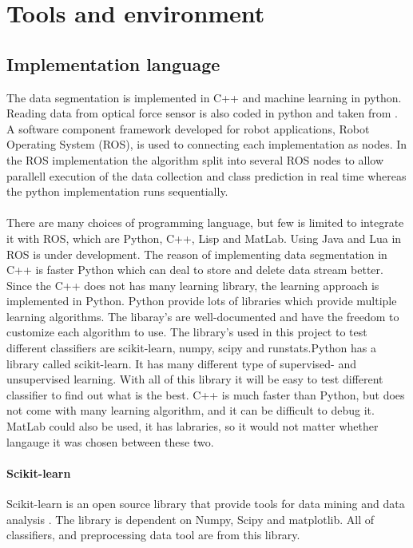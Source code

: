 \documentclass[USenglish]{ifimaster}  %
\begin{document}
\section{Tools and environment}

\subsection{Implementation language}
The data segmentation is implemented in C++ and machine learning in python. Reading data from optical force sensor is also coded in python and taken from \cite{optoRos}. A software component framework developed for robot applications, Robot Operating System (ROS), is used to connecting each implementation as nodes. In the ROS implementation the algorithm split into several ROS nodes to allow parallell execution of the data collection and class prediction in real time whereas the python implementation runs sequentially.
\\
\\
There are many choices of programming language, but few is limited to integrate it with ROS, which are Python, C++, Lisp and MatLab. Using Java and Lua in ROS is under development. The reason of implementing data segmentation in C++ is faster Python which can deal to store and delete data stream better. Since the C++ does not has many learning library, the learning approach is implemented in Python. Python provide lots of libraries which provide multiple learning algorithms. The libaray's are well-documented and have the freedom to customize each algorithm to use. The library's used in this project to test different classifiers are scikit-learn, numpy, scipy and runstats.Python has a library called scikit-learn. It has many different type of supervised- and unsupervised learning. With all of this library it will be easy to test different classifier to find out what is the best. C++ is much faster than Python, but does not come with many learning algorithm, and it can be difficult to debug it. MatLab could also be used, it has labraries, so it would not matter whether langauge it was chosen between these two.


\paragraph{Scikit-learn}
Scikit-learn is an open source library that provide tools for data mining and data analysis \cite{scikit-learn}. The library is dependent on Numpy, Scipy and matplotlib. All of classifiers, and preprocessing data tool are from this library. 
\end{document}
